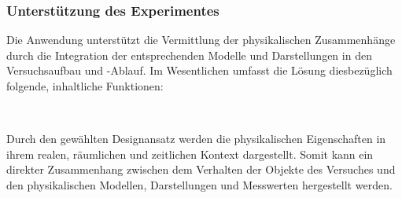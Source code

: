 \subsubsection{Unterstützung des Experimentes}
Die Anwendung unterstützt die Vermittlung der physikalischen Zusammenhänge durch die Integration der entsprechenden Modelle und Darstellungen in den Versuchsaufbau und -Ablauf. Im Wesentlichen umfasst die Lösung diesbezüglich folgende, inhaltliche Funktionen:
\vspace{8px}
\begin{center}
	\\
\end{center}
\vspace{6px}

Durch den gewählten Designansatz werden die physikalischen Eigenschaften in ihrem realen, räumlichen und zeitlichen Kontext dargestellt. Somit kann ein direkter Zusammenhang zwischen dem Verhalten der Objekte des Versuches und den physikalischen Modellen, Darstellungen und Messwerten hergestellt werden. \\

